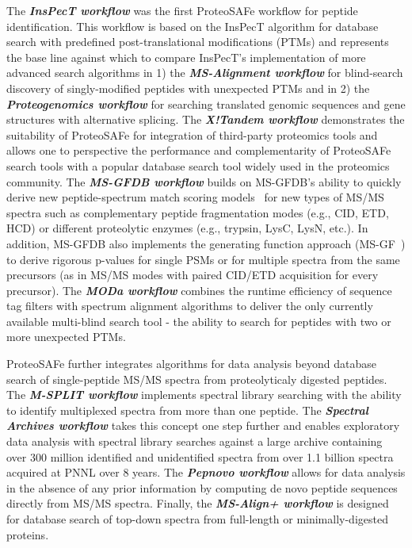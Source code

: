 \documentclass[arial,11pt]{article}
\newcommand{\SF}[1]{\textsf{#1}}
\newcommand{\SYSTEM}[0]{\SF{ProteoSAFe}\xspace}
\begin{document}
The \textbf{\em InsPecT workflow} was the first \SYSTEM workflow for peptide identification. This workflow is based on the InsPecT algorithm for database search with predefined post-translational modifications (PTMs) and represents the base line against which to compare InsPecT's implementation of more advanced search algorithms in 1) the \textbf{\em MS-Alignment workflow} for blind-search discovery of singly-modified peptides with unexpected PTMs and in 2) the \textbf{\em Proteogenomics workflow} for searching translated genomic sequences and gene structures with alternative splicing. The \textbf{\em X!Tandem workflow} demonstrates the suitability of \SYSTEM for integration of third-party proteomics tools and allows one to perspective the performance and complementarity of \SYSTEM search tools with a popular database search tool widely used in the proteomics community. The \textbf{\em MS-GFDB workflow} builds on MS-GFDB's ability to quickly derive new peptide-spectrum match scoring models~\cite{Kim:2009} for new types of MS/MS spectra such as complementary peptide fragmentation modes (e.g., CID, ETD, HCD) or different proteolytic enzymes (e.g., trypsin, LysC, LysN, etc.). In addition, MS-GFDB also implements the generating function approach (MS-GF~\cite{Kim:2008}) to derive rigorous p-values for single PSMs or for multiple spectra from the same precursors (as in MS/MS modes with paired CID/ETD acquisition for every precursor). The \textbf{\em MODa workflow} combines the runtime efficiency of sequence tag filters with spectrum alignment algorithms to deliver the only currently available multi-blind search tool - the ability to search for peptides with two or more unexpected PTMs.

\SYSTEM further integrates algorithms for data analysis beyond database search of single-peptide MS/MS spectra from proteolyticaly digested peptides. The \textbf{\em M-SPLIT workflow} implements spectral library searching with the ability to identify multiplexed spectra from more than one peptide. The \textbf{\em Spectral Archives workflow} takes this concept one step further and enables exploratory data analysis with spectral library searches against a large archive containing over 300 million identified and unidentified spectra from over 1.1 billion spectra acquired at PNNL over 8 years. The \textbf{\em Pepnovo workflow} allows for data analysis in the absence of any prior information by computing de novo peptide sequences directly from MS/MS spectra. Finally, the \textbf{\em MS-Align+ workflow} is designed for database search of top-down spectra from full-length or minimally-digested proteins.
\end{document}

